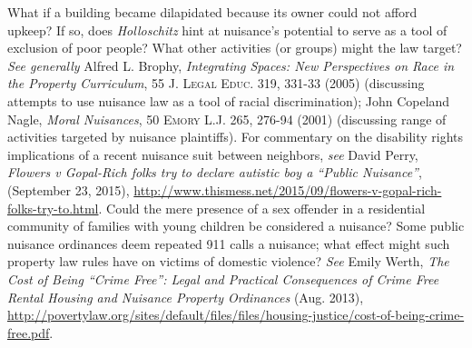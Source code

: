\item What if a building became dilapidated because its owner could not afford
upkeep? If so, does \textit{Holloschitz} hint at nuisance's potential to serve
as a tool of exclusion of poor people? What other activities (or groups) might
the law target? \textit{See generally} Alfred L. Brophy, \emph{Integrating
Spaces: New Perspectives on Race in the Property Curriculum}, 55 \textsc{J.
Legal Educ}. 319, 331-33 (2005) (discussing attempts to use nuisance law as a
tool of racial discrimination); John Copeland Nagle, \emph{Moral Nuisances}, 50
\textsc{Emory} L.J. 265, 276-94 (2001) (discussing range of activities targeted
by nuisance
plaintiffs). For commentary on the disability rights implications of a recent
nuisance suit between neighbors, \textit{see} David Perry, \textit{Flowers v
Gopal-Rich folks try to declare autistic boy a ``Public Nuisance''}, (September
23, 2015),
\url{http://www.thismess.net/2015/09/flowers-v-gopal-rich-folks-try-to.html}.
Could
the mere presence of a sex offender in a residential community of families with
young children be considered a nuisance? Some public nuisance ordinances deem
repeated 911 calls a nuisance; what effect might such property law rules have on
victims of domestic violence? \textit{See} Emily Werth, \textit{The
Cost of Being ``Crime Free'': Legal and Practical Consequences of Crime Free
Rental Housing and Nuisance Property Ordinances} (Aug. 2013),
\url{http://povertylaw.org/sites/default/files/files/housing-justice/cost-of-being-crime-free.pdf}.

